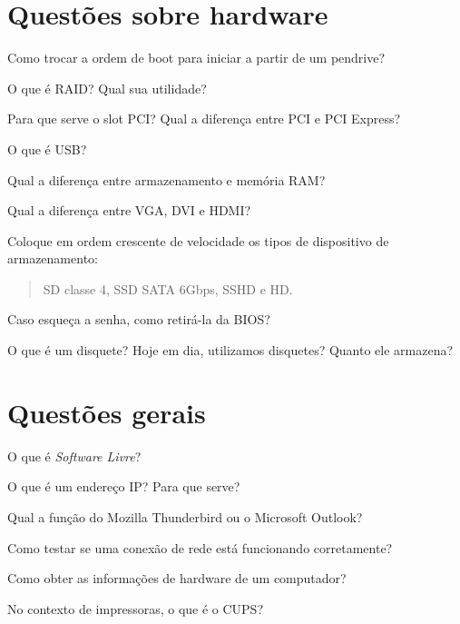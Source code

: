 \siheader
\section*{Questões sobre hardware}
\begin{questions}

\question
Como trocar a ordem de boot para iniciar a partir de um pendrive?
\vfill

\question
O que é RAID? Qual sua utilidade?
\vfill

\question
Para que serve o slot PCI? Qual a diferença entre PCI e PCI Express?
\vfill

\question
O que é USB?
\vfill

\question
Qual a diferença entre armazenamento e memória RAM?
\vfill

\question
Qual a diferença entre VGA, DVI e HDMI?
\vfill

\question
Coloque em ordem crescente de velocidade os tipos de dispositivo de
armazenamento:
\begin{quote}
SD classe 4, SSD SATA 6Gbps, SSHD e HD.
\end{quote}
\vfill

\question
Caso esqueça a senha, como retirá-la da BIOS?
\vfill

\question
O que é um disquete? Hoje em dia, utilizamos disquetes? Quanto ele
armazena?
\vfill

\end{questions}
\newpage


\siheader
\section*{Questões gerais}
\begin{questions}

\question
O que é \textit{Software Livre}?
\vfill

\question
O que é um endereço IP? Para que serve?
\vfill

\question
Qual a função do Mozilla Thunderbird ou o Microsoft Outlook?
\vfill

\question
Como testar se uma conexão de rede está funcionando corretamente?
\vfill

\question
Como obter as informações de hardware de um computador?
\vfill

\question
No contexto de impressoras, o que é o CUPS?
\vfill

\end{questions}
\newpage


